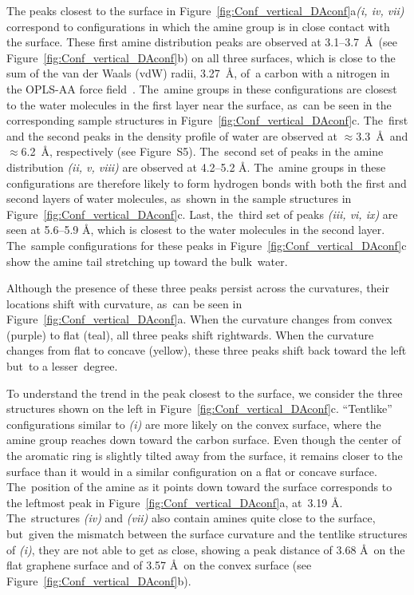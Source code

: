 \documentclass[molecules,article,accept,pdftex,moreauthors]{Definitions/mdpi}
\begin{document}
   
The peaks closest to the surface in Figure~\ref{fig:Conf_vertical_DAconf}a\emph{(i, iv, vii)} correspond to configurations in which the amine group is in close contact with the surface. These first amine distribution peaks are observed at 3.1--3.7~\AA\ (see Figure~\ref{fig:Conf_vertical_DAconf}b) on all three surfaces, which is close to the sum of the van der Waals (vdW) radii, 3.27~\AA, of~a carbon with a nitrogen in the OPLS-AA force field~\cite{OPLS-AA}. The~amine groups in these configurations are closest to the water molecules in the first layer near the surface, as~can be seen in the corresponding sample structures in Figure~\ref{fig:Conf_vertical_DAconf}c. The~first and the second peaks in the density profile of water are observed at $\approx$3.3~\AA\ and $\approx$6.2~\AA, respectively (see Figure~S5). The~second set of peaks in the amine distribution \textit{(ii, v, viii)} %
 are observed at 4.2--5.2 \AA. The~amine groups in these configurations are therefore likely to form hydrogen bonds with both the first and second layers of water molecules, as~shown in the sample structures in Figure~\ref{fig:Conf_vertical_DAconf}c. Last, the~third set of peaks \textit{(iii, vi, ix)} are seen at 5.6--5.9 \AA, which is closest to the water molecules in the second layer. The~sample configurations for these peaks in Figure~\ref{fig:Conf_vertical_DAconf}c show the amine tail stretching up toward the bulk~water.
   
Although the presence of these three peaks persist across the curvatures, their locations shift with curvature, as~can be seen in Figure~\ref{fig:Conf_vertical_DAconf}a. When the curvature changes from convex (purple) to flat (teal), all three peaks shift rightwards. When the curvature changes from flat to concave (yellow), these three peaks shift back toward the left but~to a lesser~degree.  
    
To understand the trend in the peak closest to the surface, we consider the three structures shown on the left in Figure~\ref{fig:Conf_vertical_DAconf}c. ``Tentlike'' configurations similar to \textit{(i)} are more likely on the convex surface, where the amine group reaches down toward the carbon surface. Even though the center of the aromatic ring is slightly tilted away from the surface, it remains closer to the surface than it would in a similar configuration on a flat or concave surface. The~position of the amine as it points down toward the surface corresponds to the leftmost peak in Figure~\ref{fig:Conf_vertical_DAconf}a, at~3.19 \AA. The~structures \textit{(iv)} and \textit{(vii)} also contain amines quite close to the surface, but~given the mismatch between the surface curvature and the tentlike structures of \textit{(i)}, they are not able to get as close, showing a peak distance of 3.68 \AA\ on the flat graphene surface and of 3.57 \AA\ on the convex surface (see Figure~\ref{fig:Conf_vertical_DAconf}b). 
\end{document}
